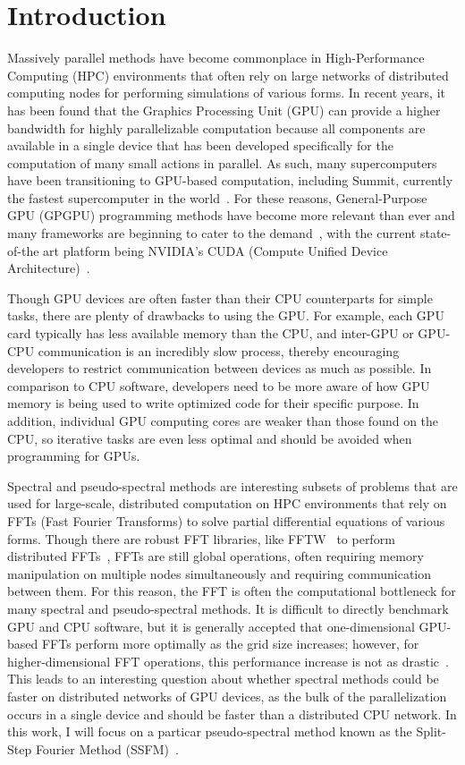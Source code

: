\section*{Introduction}

Massively parallel methods have become commonplace in High-Performance Computing (HPC) environments that often rely on large networks of distributed computing nodes for performing simulations of various forms.
In recent years, it has been found that the Graphics Processing Unit (GPU) can provide a higher bandwidth for highly parallelizable computation because all components are available in a single device that has been developed specifically for the computation of many small actions in parallel.
As such, many supercomputers have been transitioning to GPU-based computation, including Summit, currently the fastest supercomputer in the world~\cite{kahle2019}.
For these reasons, General-Purpose GPU (GPGPU) programming methods have become more relevant than ever and many frameworks are beginning to cater to the demand~\cite{reyes2012, fatica2008, besard2016, opencl}, with the current state-of-the art platform being NVIDIA's CUDA (Compute Unified Device Architecture)~\cite{CUDAPG}.

Though GPU devices are often faster than their CPU counterparts for simple tasks, there are plenty of drawbacks to using the GPU.
For example, each GPU card typically has less available memory than the CPU, and inter-GPU or GPU-CPU communication is an incredibly slow process, thereby encouraging developers to restrict communication between devices as much as possible.
In comparison to CPU software, developers need to be more aware of how GPU memory is being used to write optimized code for their specific purpose.
In addition, individual GPU computing cores are weaker than those found on the CPU, so iterative tasks are even less optimal and should be avoided when programming for GPUs.

Spectral and pseudo-spectral methods are interesting subsets of problems that are used for large-scale, distributed computation on HPC environments that rely on FFTs (Fast Fourier Transforms) to solve partial differential equations of various forms.
Though there are robust FFT libraries, like FFTW~\cite{frigo1998} to perform distributed FFTs~\cite{popovici2018}, FFTs are still global operations, often requiring memory manipulation on multiple nodes simultaneously and requiring communication between them.
For this reason, the FFT is often the computational bottleneck for many spectral and pseudo-spectral methods.
It is difficult to directly benchmark GPU and CPU software, but it is generally accepted that one-dimensional GPU-based FFTs perform more optimally as the grid size increases; however, for higher-dimensional FFT operations, this performance increase is not as drastic~\cite{merz2016}.
This leads to an interesting question about whether spectral methods could be faster on distributed networks of GPU devices, as the bulk of the parallelization occurs in a single device and should be faster than a distributed CPU network.
In this work, I will focus on a particar pseudo-spectral method known as the Split-Step Fourier Method (SSFM)~\cite{agrawal2000}.

